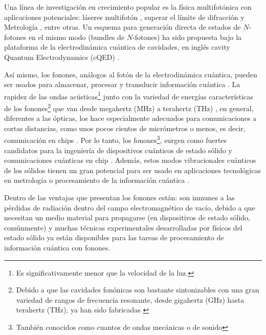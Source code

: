 \documentclass[../main.tex]{subfiles}
\begin{document}
Una línea de investigación en crecimiento popular es la física multifotónica \parencite{Kubanek2008, Ota2011} con aplicaciones potenciales: láseres multifotón \parencite{Gauthier1992}, superar el límite de difracción \parencite{DAngelo2001} y Metrología \parencite{Afek2010}, entre otras. Un esquema para generación directa de estados de $N$-fotones en el mismo modo (bundles de $N$-fotones) ha sido propuesta bajo la plataforma de la electrodinámica cuántica de cavidades, en inglés cavity Quantum Electrodynamics (cQED) \parencite{Muñoz2014}.

Así mismo, los fonones, análogos al fotón de la electrodinámica cuántica, pueden ser usados para almacenar, procesar y transducir información cuántica \parencite{Vargas2022}. La rapidez de las ondas acústicas\footnote{Es significativamente menor que la velocidad de la luz.} junto con la variedad de energías características de los fonones\footnote{Debido a que las cavidades fonónicas son bastante sintonizables con una gran variedad de rangos de frecuencia resonante, desde gigahertz (GHz) hasta terahertz (THz), ya han sido fabricadas \parencite{Borri2001} } que van desde megahertz (MHz) a terahertz (THz) \parencite{Wigger2021, Kettler2021}, en general, diferentes a las ópticas, los hace especialmente adecuados para comunicaciones a cortas distancias, como unos pocos cientos de micrómetros o menos, es decir, comunicación en chips \parencite{Gustafsson2014, Wan2021}. Por lo tanto, los fonones\footnote{También conocidos como cuantos de ondas mecánicas o de sonido}, surgen como fuertes candidatos para la ingeniería de dispositivos cuánticos de estado sólido y comunicaciones cuánticas en chip \parencite{Bin2020}. Además, estos modos vibracionales cuánticos de los sólidos tienen un gran potencial para ser usado en aplicaciones tecnológicas en metrología o procesamiento de la información cuántica \parencite{Zhang2018}.

Dentro de las ventajas que presentan los fonones están: son inmunes a las pérdidas de radiación dentro del campo electromagnético de vacío, debido a que necesitan un medio material para propagarse (en dispositivos de estado sólido, comúnmente) y muchas técnicas experimentales desarrolladas por físicos del estado sólido \parencite{Ask2019} ya están disponibles para las tareas de procesamiento de información cuántica con fonones.
\end{document}
